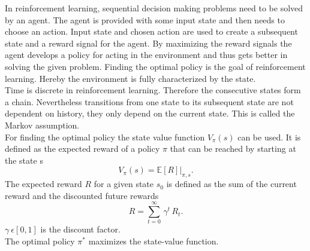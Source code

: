In reinforcement learning, sequential decision making problems need to be solved by an agent. The agent is provided with some input state and then needs to choose an action. Input state and chosen action are used to create a subsequent state and a reward signal for the agent. By maximizing the reward signals the agent develops a policy for acting in the environment and thus gets better in solving the given problem. Finding the optimal policy is the goal of reinforcement learning.
Hereby the environment is fully characterized by the state. \\
Time is discrete in reinforcement learning. Therefore the consecutive states form a chain.
Nevertheless transitions from one state to its subsequent state are not dependent on history, they only depend on the current state. This is called the Markov assumption. \\
For finding the optimal policy the state value function $V_\pi(s)$ can be used. It is defined as the expected reward of a policy $\pi$ that can be reached by starting at the state s
\begin{equation}
V_\pi(s)=\mathbb{E}\left[R\right]|_{\pi,s}.
\end{equation}
The expected reward $R$ for a given state $s_0$ is defined as the sum of the current reward and the discounted future rewards
\begin{equation}
R=\sum^\infty_{t=0}\,\gamma^t\,R_t.
\end{equation}
$\gamma\:\epsilon\left[0,1\right]$ is the discount factor.\\
The optimal policy $\pi^*$ maximizes the state-value function.